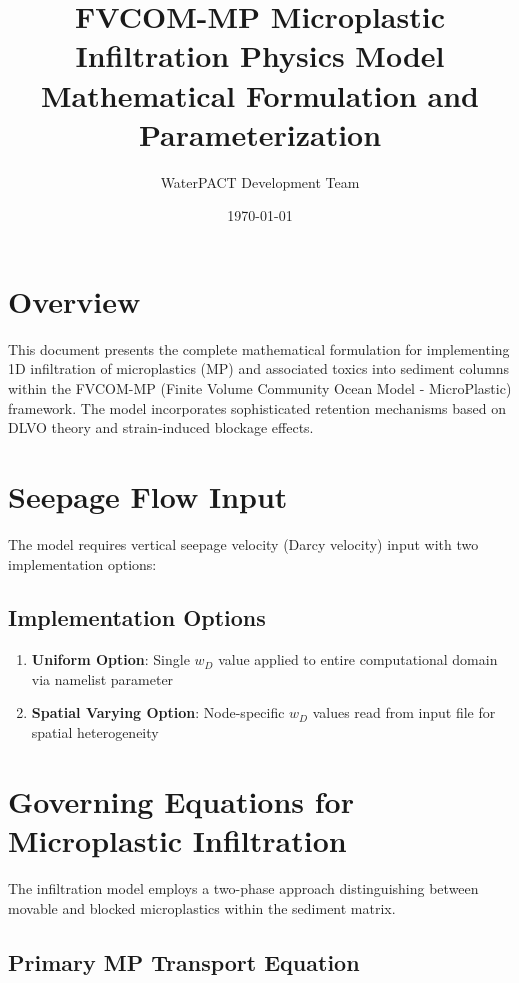 \documentclass[11pt,a4paper]{article}
\title{\textbf{FVCOM-MP Microplastic Infiltration Physics Model}\\
\large Mathematical Formulation and Parameterization}
\author{WaterPACT Development Team}
\date{\today}
\begin{document}
\maketitle

\tableofcontents
\newpage

\section{Overview}

This document presents the complete mathematical formulation for implementing 1D infiltration of microplastics (MP) and associated toxics into sediment columns within the FVCOM-MP (Finite Volume Community Ocean Model - MicroPlastic) framework. The model incorporates sophisticated retention mechanisms based on DLVO theory and strain-induced blockage effects.

\section{Seepage Flow Input}

The model requires vertical seepage velocity (Darcy velocity) input with two implementation options:

\subsection{Implementation Options}
\begin{enumerate}
    \item \textbf{Uniform Option}: Single $w_D$ value applied to entire computational domain via namelist parameter
    \item \textbf{Spatial Varying Option}: Node-specific $w_D$ values read from input file for spatial heterogeneity
\end{enumerate}

\section{Governing Equations for Microplastic Infiltration}

The infiltration model employs a two-phase approach distinguishing between movable and blocked microplastics within the sediment matrix.

\subsection{Primary MP Transport Equation}
\end{document}
